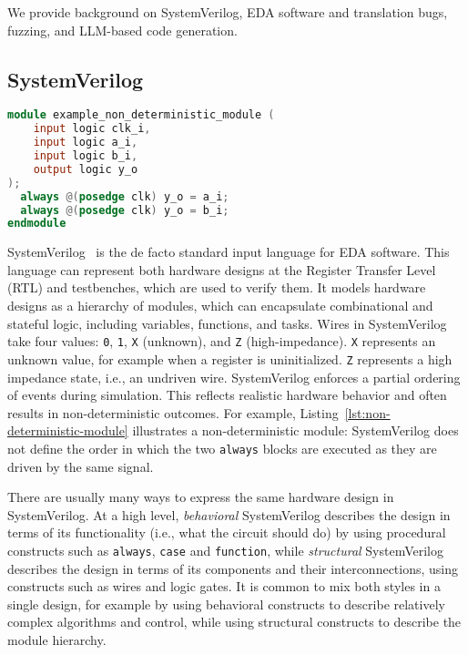 We provide background on SystemVerilog, EDA software and translation bugs, fuzzing, and LLM-based code generation.

\subsection{SystemVerilog}
\label{sec:background:verilog}

\begin{lstlisting}[caption={Example of a non-deterministic module.},label={lst:non-deterministic-module},language=verilog]
module example_non_deterministic_module (
    input logic clk_i,
    input logic a_i,
    input logic b_i,
    output logic y_o
); 
  always @(posedge clk) y_o = a_i;
  always @(posedge clk) y_o = b_i;
endmodule
\end{lstlisting}

SystemVerilog~\cite{ieee1800-2023} is the de facto standard input language for EDA software.
This language can represent both hardware designs at the Register Transfer Level (RTL) and testbenches, which are used to verify them.
It models hardware designs as a hierarchy of modules, which can encapsulate combinational and stateful logic, including variables, functions, and tasks.
Wires in SystemVerilog take four values: \texttt{0}, \texttt{1}, \texttt{X} (unknown), and \texttt{Z} (high-impedance).
\texttt{X} represents an unknown value, for example when a register is uninitialized.
\texttt{Z} represents a high impedance state, i.e., an undriven wire.
SystemVerilog enforces a partial ordering of events during simulation.
This reflects realistic hardware behavior and often results in non-deterministic outcomes.
For example, Listing~\ref{lst:non-deterministic-module} illustrates a non-deterministic module: SystemVerilog does not define the order in which the two \texttt{always} blocks are executed as they are driven by the same signal.

There are usually many ways to express the same hardware design in SystemVerilog.
At a high level, \emph{behavioral} SystemVerilog describes the design in terms of its functionality
(i.e., what the circuit should do) by using procedural constructs such as \texttt{always}, \texttt{case} and \texttt{function},
while \emph{structural} SystemVerilog describes the design in terms of its components and their interconnections,
using constructs such as wires and logic gates.
It is common to mix both styles in a single design, for example by using behavioral constructs to describe relatively complex algorithms and control, while using structural constructs to describe the module hierarchy.

